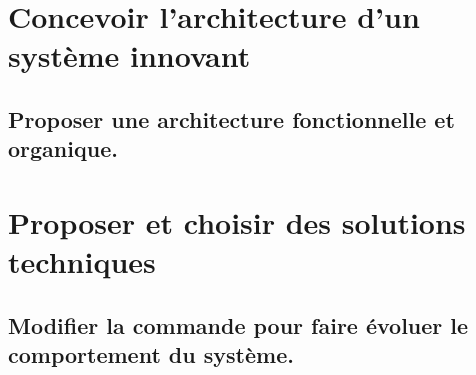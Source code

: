 \documentclass[10pt,fleqn]{article}
\newcommand{\repRel}{../..}
\newcommand{\repStyle}{\repRel/Style}
\newcommand{\td}{fichier_td}
\newcommand{\repExos}{\repRel/ExercicesCompetences}
\newcommand{\repExo}{dossier}
\begin{document}
\renewcommand{\repExo}{\repExos/E2_ProduireInformation/E2_05_Dessin2D/1012_Dessin2D}
\renewcommand{\td}{1012_Dessin2D}
\graphicspath{{\repStyle/png/}{\repExo/images/}}


\renewcommand{\repExo}{\repExos/E2_ProduireInformation/E2_05_Dessin2D/1013_Dessin2D}
\renewcommand{\td}{1013_Dessin2D}
\graphicspath{{\repStyle/png/}{\repExo/images/}}


\renewcommand{\repExo}{\repExos/E2_ProduireInformation/E2_05_Dessin2D/1014_Dessin2D}
\renewcommand{\td}{1014_Dessin2D}
\graphicspath{{\repStyle/png/}{\repExo/images/}}


\renewcommand{\repExo}{\repExos/E2_ProduireInformation/E2_05_Dessin2D/1015_Dessin2D}
\renewcommand{\td}{1015_Dessin2D}
\graphicspath{{\repStyle/png/}{\repExo/images/}}


\renewcommand{\repExo}{\repExos/E2_ProduireInformation/E2_05_Dessin2D/1016_Dessin2D}
\renewcommand{\td}{1016_Dessin2D}
\graphicspath{{\repStyle/png/}{\repExo/images/}}


\renewcommand{\repExo}{\repExos/E2_ProduireInformation/E2_05_Dessin2D/1017_Dessin2D}
\renewcommand{\td}{1017_Dessin2D}
\graphicspath{{\repStyle/png/}{\repExo/images/}}


\renewcommand{\repExo}{\repExos/E2_ProduireInformation/E2_05_Dessin2D/1020_PompeEnsieta}
\renewcommand{\td}{1020_PompeEnsieta}
\graphicspath{{\repStyle/png/}{\repExo/images/}}


\proffalse
\newpage
\def\xxchapitre{Concevoir}
\def\xxactivite{F}
\setcounter{section}{0}
\setcounter{numexo}{0}


\section{Concevoir l'architecture d'un système innovant} 

\subsection{Proposer une architecture fonctionnelle et organique.} 

\begin{multicols}{2} 

\end{multicols}

\section{Proposer et choisir des solutions techniques} 

\subsection{Modifier la commande pour faire évoluer le comportement du système. } 

\begin{multicols}{2} 

\end{multicols}
\end{document}

